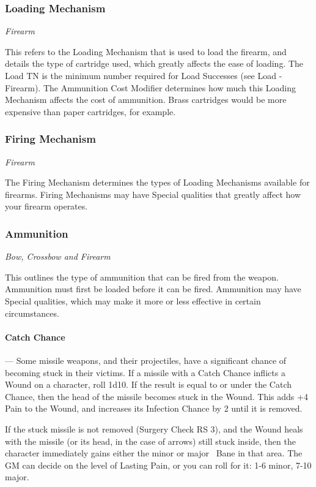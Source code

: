 \documentclass[oneside,11pt,english]{book}
\begin{document}
\subsubsection{Loading Mechanism}
\vspace{-10pt}\emph{Firearm}\par
This refers to the Loading Mechanism that is used to load the firearm, and details the type of cartridge 
used, which greatly affects the ease of loading. The Load TN is the minimum number required for Load 
Successes (see Load - Firearm). The Ammunition Cost Modifier determines how much this Loading 
Mechanism affects the cost of ammunition. Brass cartridges would be more expensive than paper cartridges, for example. 

\subsubsection{Firing Mechanism}
\vspace{-10pt}\emph{Firearm}\par
The Firing Mechanism determines the types of Loading Mechanisms available for firearms. Firing 
Mechanisms may have Special qualities that greatly affect how your firearm operates.

\subsubsection{Ammunition}
\vspace{-10pt}\emph{Bow, Crossbow and Firearm}\par
This outlines the type of ammunition that can be fired from the weapon. Ammunition must first be loaded 
before it can be fired. Ammunition may have Special qualities, which may make it more or less effective 
in certain circumstances.

\paragraph{Catch Chance}\label{par:Catch Chance}
---\quad
Some missile weapons, and their projectiles, have a significant chance of becoming stuck in their victims. 
If a missile with a Catch Chance inflicts a Wound on a character, roll 1d10. If the result is equal to or 
under the Catch Chance, then the head of the missile becomes stuck in the Wound. This adds +4 Pain to 
the Wound, and increases its Infection Chance by 2 until it is removed. 

If the stuck missile is not removed (Surgery Check RS 3), and the Wound heals with the missile (or its 
head, in the case of arrows) still stuck inside, then the character immediately gains either the minor or 
major ~Bane in that area. The GM can decide on the level of Lasting Pain, or you can roll for it: 1-6 minor, 7-10 major.
\end{document}
